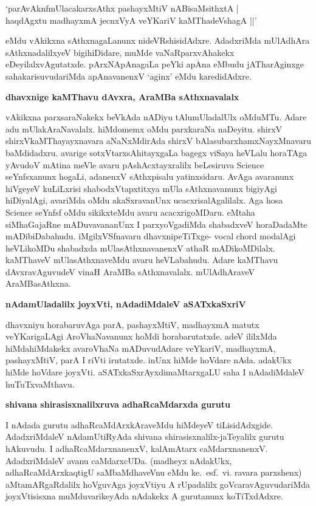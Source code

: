 \begin{shloka}
`parAvAknfmUlacakarxsAthx pashayxMtiV nABisaMsithxtA |\\\label{171}
haqdAgxtu madhayxmA jecnxVyA veYKariV kaMThadeVshagA ||'
\end{shloka}

\noindent
eMdu vAkikxna sAthxnagaLanunx nideVRshisidAdxre. AdadxriMda mUlAdhAra sAthxnadalilxyeV bigihiDi\-dare, muMde vaNaRparxvAhakekx eDeyilalxvAgutatxde. pArxNApAnagaLa peYki apAna eMbudu jATharAginxge saha\-karisuvudariMda apAnavanenxV `aginx' eMdu karedidAdxre.

{\bigskip
\noindent
{\large\bf dhavxnige kaMThavu dAvxra, AraMBa sAthxnavalalx}}\label{page171}
\medskip

\noindent
vAkikxna parxsaraNakekx beVkAda nADiyu tAlumUladalUlx oMduMTu. Adare adu mUlakAraNavalalx. hiMdomemx oMdu parxkaraNa naDeyitu. shirxV shirxVkaMThayayxnavara aNaNxMdirAda shirxV bAlasubarxhamxNayxMnavaru baMdidadxru. avarige sotxVtarxsAhitayxgaLa bagegx viSaya heVLalu horaTAga yAvudoV mAtina meVle avaru pAshAcxtayxralilx beLesiruva {\rm Science} seYnfsxanunx hogaLi, adanenxV sAthxpisalu yatinxsidaru. AvAga avaranunx hiVgeyeV kuLiLxrisi shabodxVtapxtitxya mUla sAthxnavanunx bigiyAgi hiDiyalAgi, avariMda oMdu akaSxravanUnx ucacxrisalAgalilalx. Aga hosa {\rm Science} seYnfsf oMdu sikikxteMdu avaru acacxrigoMDaru. eMtaha siMhaGajaRne mADuvavananUnx I parxyoVgadiMda shabadxveV horaDadaMte mADibiDabahudu. iMgilxVSfnavaru dhavxnipeTiTxge- {\rm vocal chord} modalAgi heVLikoMDu shabadxda mUlasAthxnavanenxV athaR mADikoMDilalx. kaMThaveV mUlasAthxnaveMdu avaru heVLabahudu. Adare kaMThavu dAvxravAguvudeV vinaH AraMBa sAthxnavalalx. mUlAdhAraveV AraMBasAthxna. 

{\bigskip
\noindent
{\large\bf nAdamUladalilx joyxVti, nAdadiMdaleV aSATxkaSxriV}}\label{page172}
\medskip

\noindent
dhavxniyu horabaruvAga parA, pashayxMtiV, madhayxmA matutx veYKarigaLAgi AroVhaNavanunx hoMdi horabarutatxde. adeV ililxMda hiMdahiMdakekx avaroVhaNa mADuvudAdare veYkariV, madhayxmA, pashayxMtiV, parA I riVti irutatxde. inUnx hiMde hoVdare nAda. adakUkx hiMde hoVdare joyxVti. aSATxkaSxrAyxdi\-maMtarxgaLU saha I nAdadiMdaleV huTuTxvaMthavu.

{\bigskip
\noindent
{\large\bf shivana shirasisxnalilxruva adhaRcaMdarxda gurutu}}\label{page172}
\medskip

\noindent
I nAdada gurutu adhaRcaMdArxkAraveMdu hiMdeyeV tiLisidAdxgide. AdadxriMdaleV nAdamUtiR\-yAda shivana shirasisxnalilx-jaTeyalilx gurutu hAkuvudu. I adhaRcaMdarxnanenxV, kalAmAtarx caMdarx\-nanenxV. AdadxriMdaleV avanu caMdarxcUDa. (madheyx nAdakUkx, adhaRcaMdArxkaqtigU saMbaMdhaveVnu eMdu ke.~esf.~vi. ravara parxshenx) aMtamARgaRdalilx hoVguvAga joyxVtiyu A rUpadalilx goVcaravAguvuda\-riMda joyxVtisisxna muMduvarikeyAda nAdakekx A gurutanunx koTiTxdAdxre.

